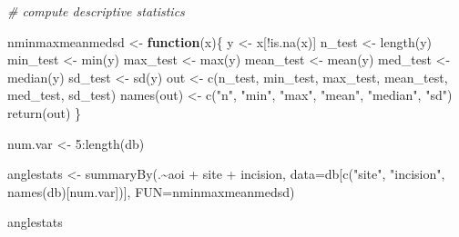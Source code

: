 \documentclass[
]{article}
\newenvironment{Shaded}{\begin{snugshade}}{\end{snugshade}}
\newcommand{\AttributeTok}[1]{\textcolor[rgb]{0.77,0.63,0.00}{#1}}
\newcommand{\CommentTok}[1]{\textcolor[rgb]{0.56,0.35,0.01}{\textit{#1}}}
\newcommand{\ControlFlowTok}[1]{\textcolor[rgb]{0.13,0.29,0.53}{\textbf{#1}}}
\newcommand{\DecValTok}[1]{\textcolor[rgb]{0.00,0.00,0.81}{#1}}
\newcommand{\FunctionTok}[1]{\textcolor[rgb]{0.00,0.00,0.00}{#1}}
\newcommand{\NormalTok}[1]{#1}
\newcommand{\OtherTok}[1]{\textcolor[rgb]{0.56,0.35,0.01}{#1}}
\newcommand{\SpecialCharTok}[1]{\textcolor[rgb]{0.00,0.00,0.00}{#1}}
\newcommand{\StringTok}[1]{\textcolor[rgb]{0.31,0.60,0.02}{#1}}
\begin{document}
\begin{Shaded}
\begin{Highlighting}[]
\CommentTok{\# compute descriptive statistics}

\NormalTok{nminmaxmeanmedsd }\OtherTok{\textless{}{-}} \ControlFlowTok{function}\NormalTok{(x)\{}
\NormalTok{    y }\OtherTok{\textless{}{-}}\NormalTok{ x[}\SpecialCharTok{!}\FunctionTok{is.na}\NormalTok{(x)]}
\NormalTok{    n\_test }\OtherTok{\textless{}{-}} \FunctionTok{length}\NormalTok{(y)}
\NormalTok{    min\_test }\OtherTok{\textless{}{-}} \FunctionTok{min}\NormalTok{(y)}
\NormalTok{    max\_test }\OtherTok{\textless{}{-}} \FunctionTok{max}\NormalTok{(y)}
\NormalTok{    mean\_test }\OtherTok{\textless{}{-}} \FunctionTok{mean}\NormalTok{(y)}
\NormalTok{    med\_test }\OtherTok{\textless{}{-}} \FunctionTok{median}\NormalTok{(y)}
\NormalTok{    sd\_test }\OtherTok{\textless{}{-}} \FunctionTok{sd}\NormalTok{(y)}
\NormalTok{    out }\OtherTok{\textless{}{-}} \FunctionTok{c}\NormalTok{(n\_test, min\_test, max\_test, mean\_test, med\_test, sd\_test)}
    \FunctionTok{names}\NormalTok{(out) }\OtherTok{\textless{}{-}} \FunctionTok{c}\NormalTok{(}\StringTok{"n"}\NormalTok{, }\StringTok{"min"}\NormalTok{, }\StringTok{"max"}\NormalTok{, }\StringTok{"mean"}\NormalTok{, }\StringTok{"median"}\NormalTok{, }\StringTok{"sd"}\NormalTok{)}
    \FunctionTok{return}\NormalTok{(out)}
\NormalTok{\}}

\NormalTok{num.var }\OtherTok{\textless{}{-}} \DecValTok{5}\SpecialCharTok{:}\FunctionTok{length}\NormalTok{(db)}

\NormalTok{anglestats }\OtherTok{\textless{}{-}} \FunctionTok{summaryBy}\NormalTok{(.}\SpecialCharTok{\textasciitilde{}}\NormalTok{aoi }\SpecialCharTok{+}\NormalTok{ site }\SpecialCharTok{+}\NormalTok{ incision, }\AttributeTok{data=}\NormalTok{db[}\FunctionTok{c}\NormalTok{(}\StringTok{"site"}\NormalTok{, }\StringTok{"incision"}\NormalTok{, }\FunctionTok{names}\NormalTok{(db)[num.var])], }\AttributeTok{FUN=}\NormalTok{nminmaxmeanmedsd)}

\NormalTok{anglestats}
\end{Highlighting}
\end{Shaded}
\end{document}
